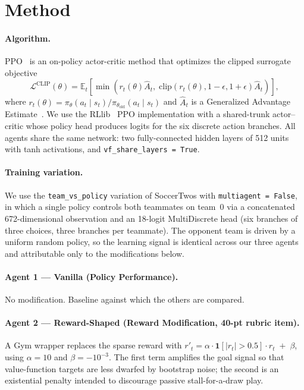 \documentclass{article}
\begin{document}

\section{Method}
\label{sec:method}

\paragraph{Algorithm.}
PPO~\citep{schulman2017proximal} is an on-policy actor-critic method that optimizes the clipped surrogate objective
\[
\mathcal{L}^{\text{CLIP}}(\theta) = \mathbb{E}_t \!\left[\min\!\left(r_t(\theta)\hat{A}_t,\; \mathrm{clip}(r_t(\theta), 1-\epsilon, 1+\epsilon)\hat{A}_t\right)\right],
\]
where $r_t(\theta) = \pi_\theta(a_t\mid s_t)/\pi_{\theta_{\text{old}}}(a_t\mid s_t)$ and $\hat{A}_t$ is a Generalized Advantage Estimate~\citep{schulman2016gae}.
We use the RLlib~\citep{liang2018rllib} PPO implementation with a shared-trunk actor--critic whose policy head produces logits for the six discrete action branches.
All agents share the same network: two fully-connected hidden layers of 512 units with tanh activations, and \texttt{vf\_share\_layers = True}.

\paragraph{Training variation.}
We use the \texttt{team\_vs\_policy} variation of SoccerTwos with \texttt{multiagent = False}, in which a single policy controls both teammates on team~0 via a concatenated 672-dimensional observation and an 18-logit MultiDiscrete head (six branches of three choices, three branches per teammate).
The opponent team is driven by a uniform random policy, so the learning signal is identical across our three agents and attributable only to the modifications below.

\paragraph{Agent 1 --- Vanilla (Policy Performance).}
No modification. Baseline against which the others are compared.

\paragraph{Agent 2 --- Reward-Shaped (Reward Modification, 40-pt rubric item).}
A Gym wrapper replaces the sparse reward with
$r'_t = \alpha \cdot \mathbf{1}[|r_t| > 0.5]\cdot r_t \;+\; \beta$,
using $\alpha = 10$ and $\beta = -10^{-3}$.
The first term amplifies the goal signal so that value-function targets are less dwarfed by bootstrap noise; the second is an existential penalty intended to discourage passive stall-for-a-draw play.
\end{document}

